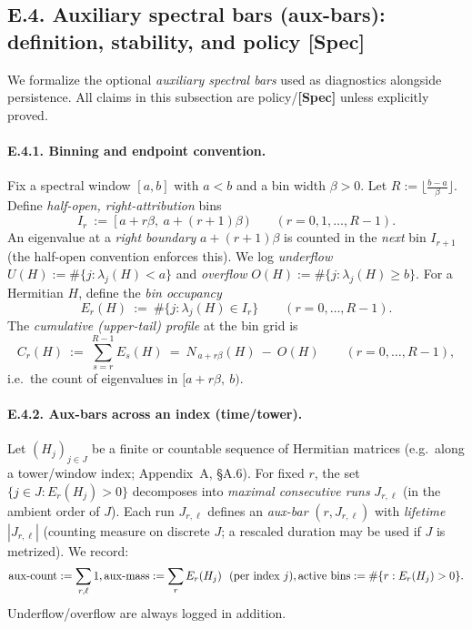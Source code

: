 \documentclass[11pt]{article}
\numberwithin{equation}{section}
\theoremstyle{definition}
\providecommand{\n}{\unskip\space}
\begin{document}
\subsection*{E.4. Auxiliary spectral bars (aux-bars): definition, stability, and policy \texorpdfstring{[Spec]}{[Spec]}}

We formalize the optional \emph{auxiliary spectral bars} used as diagnostics alongside persistence.
All claims in this subsection are policy/\textbf{[Spec]} unless explicitly proved.

\paragraph{E.4.1. Binning and endpoint convention.}
Fix a spectral window \([a,b]\) with \(a<b\) and a bin width \(\beta>0\).
Let \(R:=\big\lfloor\frac{b-a}{\beta}\big\rfloor\).
Define \emph{half-open, right-attribution} bins
\[
I_r\ :=\ [\,a+r\beta,\ a+(r+1)\beta\,)\qquad (r=0,1,\dots,R-1).
\]
An eigenvalue at a \emph{right boundary} \(a+(r+1)\beta\) is counted in the \emph{next} bin \(I_{r+1}\) (the half-open convention enforces this).
We log \emph{underflow} \(U(H):=\#\{j:\lambda_j(H)<a\}\) and \emph{overflow} \(O(H):=\#\{j:\lambda_j(H)\ge b\}\).
For a Hermitian \(H\), define the \emph{bin occupancy}
\[
E_r(H)\ :=\ \#\{j:\lambda_j(H)\in I_r\}\qquad (r=0,\dots,R-1).
\]
The \emph{cumulative (upper-tail) profile} at the bin grid is
\[
C_r(H)\ :=\ \sum_{s=r}^{R-1} E_s(H)\ =\ N_{\,a+r\beta}(H)\ -\ O(H)\qquad (r=0,\dots,R-1),
\]
i.e.\ the count of eigenvalues in \([a+r\beta,\ b)\).

\paragraph{E.4.2. Aux-bars across an index (time/tower).}
Let \((H_j)_{j\in J}\) be a finite or countable sequence of Hermitian matrices (e.g.\ along a tower/window index; Appendix~A, §A.6).
For fixed \(r\), the set \(\{j\in J: E_r(H_j)>0\}\) decomposes into \emph{maximal consecutive runs} \(J_{r,\ell}\) (in the ambient order of \(J\)).
Each run \(J_{r,\ell}\) defines an \emph{aux-bar} \((r, J_{r,\ell})\) with \emph{lifetime} \(|J_{r,\ell}|\) (counting measure on discrete \(J\); a rescaled duration may be used if \(J\) is metrized).
We record:
\[
\mathrm{aux\text{-}count}:=\sum_{r,\ell} 1,\qquad\n\mathrm{aux\text{-}mass}:=\sum_{r} E_r(H_j)\ \ \text{(per index \(j\))},\qquad\n\mathrm{active\ bins}:=\#\{r: E_r(H_j)>0\}.
\]
Underflow/overflow are always logged in addition.
\end{document}
